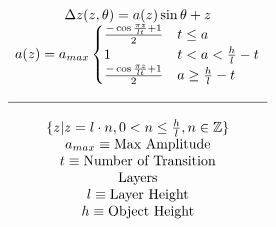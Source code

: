 \documentclass[border={5pt 5pt 5pt 5pt}]{standalone}
\begin{document}
$
	\begin{matrix}
		\Delta z(z,\theta)=a(z)\sin{\theta} + z\\
		a(z) = a_{max}
			\begin{cases}
				\frac{-\cos{\frac{\pi z}{lt}}+1}{2} & t \leq a\\
				1 & t < a < \frac{h}{l}-t\\
				\frac{-\cos{\frac{\pi z}{lt}}+1}{2} & a \geq \frac{h}{l}-t\\
			\end{cases}\\
		\\
		\hline
		\\
		
		\{z|z=l\cdot n, 0 < n \leq \frac{h}{l}, n\in \mathbb{Z}\}\\
		a_{max} \equiv \text{Max Amplitude}\\
		t \equiv \text{Number of Transition}\\ \text{Layers}\\
		l \equiv \text{Layer Height}\\
		h \equiv \text{Object Height}
	\end{matrix}
$
\end{document}
